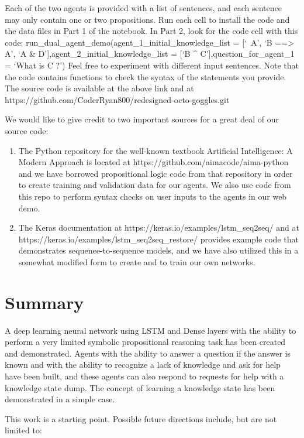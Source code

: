 \documentclass{article}
\begin{document}
Each of the two agents is provided with a list of sentences, and each sentence may only contain one or two propositions. Run each cell to install the code and the data files in Part 1 of the notebook. In Part 2, look for the code cell with this code:
run\_dual\_agent\_demo(agent\_1\_initial\_knowledge\_list = [‘~A’, ‘B ==> A’, ‘A \& D’],agent\_2\_initial\_knowledge\_list = [‘B ^ C’],question\_for\_agent\_1 = ‘What is C ?’)
Feel free to experiment with different input sentences. Note that the code contains functions to check the syntax of the statements you provide.
The source code is available at the above link and at https://github.com/CoderRyan800/redesigned-octo-goggles.git

We would like to give credit to two important sources for a great deal of our source code:
\begin{enumerate}
	\item The Python repository for the well-known textbook Artificial Intelligence: A Modern Approach is located at https://github.com/aimacode/aima-python and we have borrowed propositional logic code from that repository in order to create training and validation data for our agents. We also use code from this repo to perform syntax checks on user inputs to the agents in our web demo.
	\item The Keras documentation at https://keras.io/examples/lstm_seq2seq/ and at https://keras.io/examples/lstm_seq2seq_restore/ provides example code that demonstrates sequence-to-sequence models, and we have also utilized this in a somewhat modified form to create and to train our own networks.
\end{enumerate}

\section{Summary}

A deep learning neural network using LSTM and Dense layers with the ability to perform a very limited symbolic propositional reasoning task has been created and demonstrated. Agents with the ability to answer a question if the answer is known and with the ability to recognize a lack of knowledge and ask for help have been built, and these agents can also respond to requests for help with a knowledge state dump. The concept of learning a knowledge state has been demonstrated in a simple case.

This work is a starting point. Possible future directions include, but are not limited to:
\end{document}
